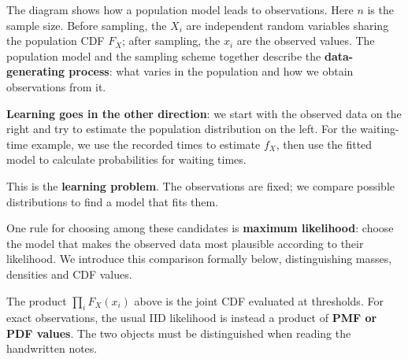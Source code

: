 \documentclass[a4paper,12pt,oneside]{report}
\begin{document}
\begin{center}
\end{center}

The diagram shows how a population model leads to observations.
Here $n$ is the sample size. Before sampling, the $X_i$ are
independent random variables sharing the population CDF $F_X$;
after sampling, the $x_i$ are the observed values.
The population model and the sampling scheme together describe
the \textbf{data-generating process}: what varies in the population
and how we obtain observations from it.

\textbf{Learning goes in the other direction}: we start with the
observed data on the right and try to estimate the population
distribution on the left. For the waiting-time example, we use
the recorded times to estimate $f_X$, then use the fitted model
to calculate probabilities for waiting times.

This is the \textbf{learning problem}. The observations are fixed;
we compare possible distributions to find a model that fits them.

One rule for choosing among these candidates is \textbf{maximum
likelihood}: choose the model that makes the observed data most
plausible according to their likelihood. We introduce this
comparison formally below, distinguishing masses, densities and
CDF values.

\begin{notebox}
The product $\prod_iF_X(x_i)$ above is the joint CDF evaluated
at thresholds. For exact observations, the usual IID likelihood
is instead a product of \textbf{PMF or PDF values}.
The two objects must be distinguished when reading the
handwritten notes.
\end{notebox}
\end{document}

